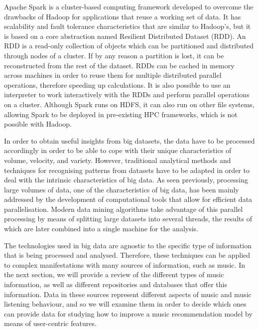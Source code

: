 Apache Spark \autocite{zaharia10spark} is a cluster-based computing framework developed to overcome the drawbacks of Hadoop for applications that reuse a working set of data. 
It has scalability and fault tolerance characteristics that are similar to Hadoop's, but it is based on a core abstraction named Resilient Distributed Dataset (RDD). 
An RDD is a read-only collection of objects which can be partitioned and distributed through nodes of a cluster. If by any reason a partition is lost, it can be reconstructed from the rest of the dataset. RDDs can be cached in memory across machines in order to reuse them for multiple distributed parallel operations, therefore speeding up calculations. It is also possible to use an interpreter to work interactively  with the RDDs and perform parallel operations on a cluster.
Although Spark runs on HDFS, it can also run on other file systems, allowing Spark to be deployed in pre-existing HPC frameworks, which is not possible with Hadoop. 




In order to obtain useful insights from big datasets, the data have to be processed accordingly in order to be able to cope with their unique characteristics of volume, velocity, and variety. 
However, traditional analytical methods and techniques for recognising patterns from datasets have to be adapted in order to deal with the intrinsic characteristics of big data. 
As seen previously, processing large volumes of data, one of the characteristics of big data, has been mainly addressed by the development of computational tools that allow for efficient data parallelisation. 
Modern data mining algorithms take advantage of this parallel processing by means of splitting large datasets into several threads, the results of which are later combined into a single machine for the analysis.

The technologies used in big data are agnostic to the specific type of information that is being processed and analysed. 
Therefore, these techniques can be applied to complex manifestations with many sources of information, such as music.
In the next section, we will provide a review of the different types of music information, as well as different repositories and databases that offer this information. Data in these sources represent different aspects of music and music listening behaviour, and so we will examine them in order to decide which ones can provide data for studying how to improve a music recommendation model by means of user-centric features. 



